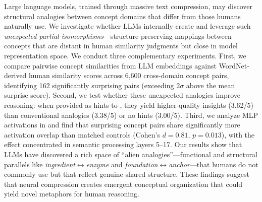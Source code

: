 Large language models, trained through massive text compression, may discover structural analogies between concept domains that differ from those humans naturally use.
We investigate whether LLMs internally create and leverage such \emph{unexpected partial isomorphisms}---structure-preserving mappings between concepts that are distant in human similarity judgments but close in model representation space.
We conduct three complementary experiments.
First, we compare pairwise concept similarities from LLM embeddings against WordNet-derived human similarity scores across 6,600 cross-domain concept pairs, identifying 162 significantly surprising pairs (exceeding $2\sigma$ above the mean surprise score).
Second, we test whether these unexpected analogies improve reasoning: when provided as hints to \gptfour, they yield higher-quality insights (3.62/5) than conventional analogies (3.38/5) or no hints (3.00/5).
Third, we analyze MLP activations in \pythia and find that surprising concept pairs share significantly more activation overlap than matched controls (Cohen's $d = 0.81$, $p = 0.013$), with the effect concentrated in semantic processing layers 5--17.
Our results show that LLMs have discovered a rich space of ``alien analogies''---functional and structural parallels like \emph{ingredient}$\leftrightarrow$\emph{enzyme} and \emph{foundation}$\leftrightarrow$\emph{anchor}---that humans do not commonly use but that reflect genuine shared structure.
These findings suggest that neural compression creates emergent conceptual organization that could yield novel metaphors for human reasoning.
